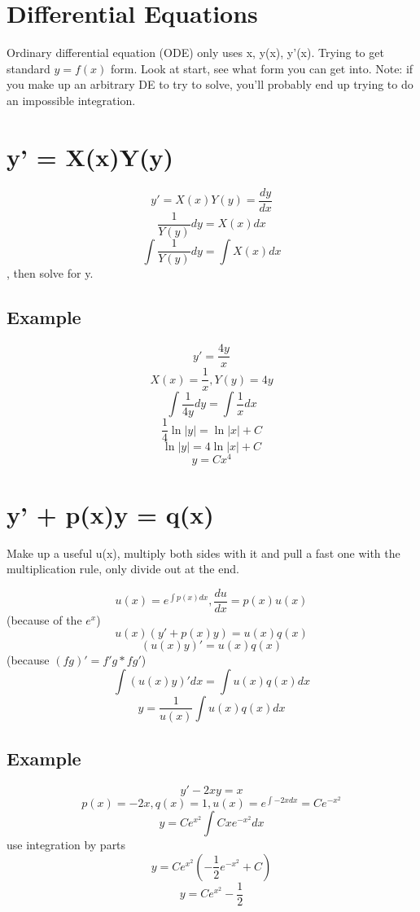 \section{Differential Equations}

Ordinary differential equation (ODE) only uses x, y(x), y'(x). Trying
to get standard $y = f(x)$ form. Look at start, see what form you can
get into. Note: if you make up an arbitrary DE to try to solve, you'll
probably end up trying to do an impossible integration.

\begin{multicols}{2}

\section{y' = X(x)Y(y)}

$$ y' = X(x)Y(y) = \frac{dy}{dx} $$
$$ \frac{1}{Y(y)}dy = X(x)dx $$
$$ \int\frac{1}{Y(y)}dy = \int X(x)dx $$, then solve for y.

\subsection{Example}

$$ y' = \frac{4y}{x} $$
$$ X(x) = \frac{1}{x}, Y(y) = 4y $$
$$ \int\frac{1}{4y}dy = \int\frac{1}{x}dx  $$
$$ \frac{1}{4}\ln|y| = \ln|x| + C $$
$$ \ln|y| = 4\ln|x| + C $$
$$ y = Cx^4 $$
\columnbreak

\section{y' + p(x)y = q(x)}

Make up a useful u(x), multiply both sides with it and pull a fast one
with the multiplication rule, only divide out at the end.

$$ u(x) = e^{\int p(x)dx}, \frac{du}{dx} = p(x)u(x) $$ (because of the
$e^x$)
$$ u(x)(y' + p(x)y) = u(x)q(x) $$
$$ (u(x)y)' = u(x)q(x) $$ (because $(fg)' = f'g * fg'$)
$$ \int (u(x)y)' dx = \int u(x)q(x)dx $$
$$ y = \frac{1}{u(x)}\int u(x)q(x)dx $$

\subsection{Example}

$$ y' - 2xy = x $$
$$ p(x) = -2x, q(x) = 1, u(x) = e^{\int -2xdx} = Ce^{-x^2} $$
$$ y = Ce^{x^2}\int Cxe^{-x^2}dx $$
use integration by parts
$$ y = Ce^{x^2}(-\frac{1}{2}e^{-x^2} + C)$$
$$ y = Ce^{x^2} - \frac{1}{2} $$
\end{multicols}

